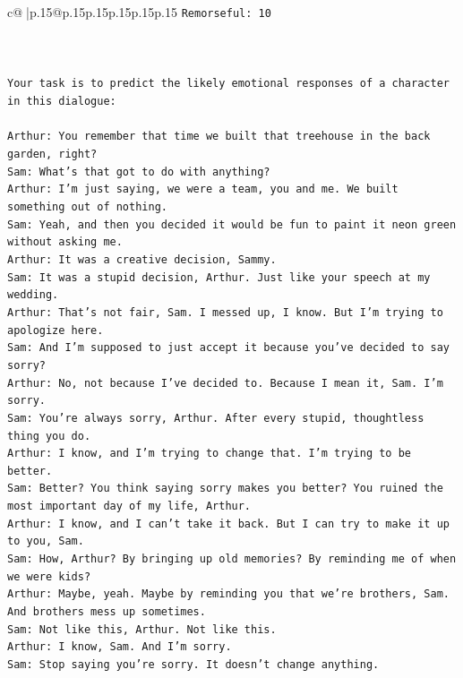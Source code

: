 \documentclass{article}
\begin{document}
{\begin{supertabular}{c@{$\;$}|p{.15\linewidth}@{}p{.15\linewidth}p{.15\linewidth}p{.15\linewidth}p{.15\linewidth}p{.15\linewidth}}
{{{\texttt{Remorseful: 10} \\
\\ 
\\ 
\\ 
\texttt{Your task is to predict the likely emotional responses of a character in this dialogue:} \\
\\ 
\texttt{Arthur: You remember that time we built that treehouse in the back garden, right?} \\
\texttt{Sam: What's that got to do with anything?} \\
\texttt{Arthur: I'm just saying, we were a team, you and me. We built something out of nothing. } \\
\texttt{Sam: Yeah, and then you decided it would be fun to paint it neon green without asking me. } \\
\texttt{Arthur: It was a creative decision, Sammy. } \\
\texttt{Sam: It was a stupid decision, Arthur. Just like your speech at my wedding.} \\
\texttt{Arthur: That's not fair, Sam. I messed up, I know. But I'm trying to apologize here.} \\
\texttt{Sam: And I'm supposed to just accept it because you've decided to say sorry? } \\
\texttt{Arthur: No, not because I've decided to. Because I mean it, Sam. I'm sorry.} \\
\texttt{Sam: You're always sorry, Arthur. After every stupid, thoughtless thing you do. } \\
\texttt{Arthur: I know, and I'm trying to change that. I'm trying to be better.} \\
\texttt{Sam: Better? You think saying sorry makes you better? You ruined the most important day of my life, Arthur.} \\
\texttt{Arthur: I know, and I can't take it back. But I can try to make it up to you, Sam.} \\
\texttt{Sam: How, Arthur? By bringing up old memories? By reminding me of when we were kids?} \\
\texttt{Arthur: Maybe, yeah. Maybe by reminding you that we're brothers, Sam. And brothers mess up sometimes.} \\
\texttt{Sam: Not like this, Arthur. Not like this.} \\
\texttt{Arthur: I know, Sam. And I'm sorry.} \\
\texttt{Sam: Stop saying you're sorry. It doesn't change anything.} \\
}}}
\end{supertabular}}
\end{document}
